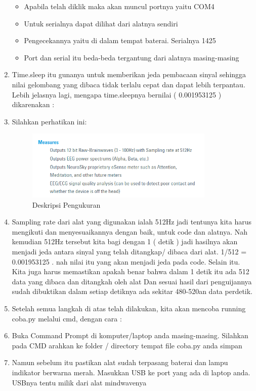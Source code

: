 \begin{enumerate}
\begin{itemize}
\item Apabila telah diklik maka akan muncul portnya yaitu COM4 
\item Untuk serialnya dapat dilihat dari alatnya sendiri 
\item Pengecekannya yaitu di dalam tempat baterai. Serialnya 1425
\item Port dan serial itu beda-beda tergantung dari alatnya masing-masing
\end{itemize}
\item Time.sleep itu gunanya untuk memberikan jeda pembacaan sinyal sehingga nilai gelombang yang dibaca tidak terlalu cepat dan dapat lebih terpantau. Lebih jelasnya lagi, mengapa time.sleepnya bernilai ( 0.001953125 ) dikarenakan :
\item Silahkan perhatikan ini:

\begin{figure}[!htbp]
	\centerline{\includegraphics[width=0.85\textwidth]{figures/8/measures.png}}
	\caption{Deskripsi Pengukuran}
	\label{fig:measures}
\end{figure}
\item Sampling rate dari alat yang digunakan ialah 512Hz jadi tentunya kita harus mengikuti dan menyesuaikannya dengan baik, untuk code dan alatnya. Nah kemudian 512Hz tersebut kita bagi dengan 1 ( detik ) jadi hasilnya akan menjadi jeda antara sinyal yang telah ditangkap/ dibaca dari alat. 1/512 = 0.001953125 . nah nilai itu yang akan menjadi jeda pada code.
 Selain itu. Kita juga harus memastikan apakah benar bahwa dalam 1 detik itu ada 512 data yang dibaca dan ditangkah oleh alat Dan sesuai hasil dari penguijannya sudah dibuktikan dalam setiap detiknya ada sekitar 480-520an data perdetik.
\item Setelah semua langkah di atas telah dilakukan, kita akan mencoba running coba.py melalui cmd, dengan cara :
\item Buka Command Prompt di komputer/laptop anda masing-masing. Silahkan pada CMD arahkan ke folder / directory tempat file coba.py anda simpan
\item Namun sebelum itu pastikan alat sudah terpasang baterai dan lampu indikator berwarna merah. Masukkan USB ke port yang ada di laptop anda. USBnya tentu milik dari alat mindwavenya

\end{enumerate}
